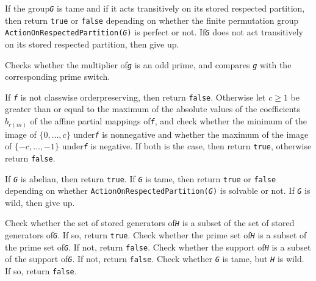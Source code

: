 \documentclass[a4paper,11pt]{report}
\begin{document}
{\begin{description}
 If the group{\nobreakspace}\mbox{\texttt{\mdseries\slshape G}} is tame and if it acts transitively on its stored respected partition, then
return \texttt{true} or \texttt{false} depending on whether the finite permutation group \texttt{ActionOnRespectedPartition(\mbox{\texttt{\mdseries\slshape G}})} is perfect or not. If{\nobreakspace}\mbox{\texttt{\mdseries\slshape G}} does not act transitively on its stored respected partition, then give up. 
\item[{ \texttt{IsPrimeSwitch(\mbox{\texttt{\mdseries\slshape g}})} }]  Checks whether the multiplier of{\nobreakspace}\mbox{\texttt{\mdseries\slshape g}} is an odd prime, and compares \mbox{\texttt{\mdseries\slshape g}} with the corresponding prime switch. 
\item[{ \texttt{IsSignPreserving(\mbox{\texttt{\mdseries\slshape f}})} }]  If \mbox{\texttt{\mdseries\slshape f}} is not class\texttt{}wise order\texttt{}preserving, then
return \texttt{false}. Otherwise let $c \geq 1$ be greater than or equal to the maximum of the absolute values of the
coefficients $b_{r(m)}$ of the affine partial mappings of{\nobreakspace}\mbox{\texttt{\mdseries\slshape f}}, and check whether the minimum of the image of $\{0, \dots, c\}$ under{\nobreakspace}\mbox{\texttt{\mdseries\slshape f}} is nonnegative and whether the maximum of the image of $\{-c, \dots, -1\}$ under{\nobreakspace}\mbox{\texttt{\mdseries\slshape f}} is negative. If both is the case, then return \texttt{true}, otherwise return \texttt{false}. 
\item[{ \texttt{IsSolvableGroup(\mbox{\texttt{\mdseries\slshape G}})} }]  If \mbox{\texttt{\mdseries\slshape G}} is abelian, then return \texttt{true}. If \mbox{\texttt{\mdseries\slshape G}} is tame, then return \texttt{true} or \texttt{false} depending on whether \texttt{ActionOnRespectedPartition(\mbox{\texttt{\mdseries\slshape G}})} is solvable or not. If \mbox{\texttt{\mdseries\slshape G}} is wild, then give up. 
\item[{ \texttt{IsSubset(\mbox{\texttt{\mdseries\slshape G}},\mbox{\texttt{\mdseries\slshape H}})} (checking for a subgroup relation) }]  Check whether the set of stored generators of{\nobreakspace}\mbox{\texttt{\mdseries\slshape H}} is a subset of the set of stored generators of{\nobreakspace}\mbox{\texttt{\mdseries\slshape G}}. If so, return \texttt{true}. Check whether the prime set of{\nobreakspace}\mbox{\texttt{\mdseries\slshape H}} is a subset of the prime set of{\nobreakspace}\mbox{\texttt{\mdseries\slshape G}}. If not, return \texttt{false}. Check whether the support of{\nobreakspace}\mbox{\texttt{\mdseries\slshape H}} is a subset of the support of{\nobreakspace}\mbox{\texttt{\mdseries\slshape G}}. If not, return \texttt{false}. Check whether \mbox{\texttt{\mdseries\slshape G}} is tame, but \mbox{\texttt{\mdseries\slshape H}} is wild. If so, return \texttt{false}. 


\end{description}}
\end{document}
